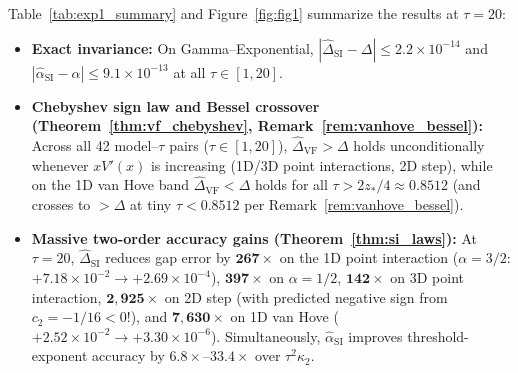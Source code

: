 \documentclass[11pt,a4paper]{article}
\theoremstyle{definition}
\begin{document}
Table~\ref{tab:exp1_summary} and Figure~\ref{fig:fig1} summarize the results at $\tau = 20$:
\begin{itemize}[leftmargin=1.6em,itemsep=2pt]
  \item \textbf{Exact invariance:} On Gamma--Exponential, $|\widehat{\Delta}_{\mathrm{SI}} - \Delta| \le 2.2 \times 10^{-14}$ and $|\widehat{\alpha}_{\mathrm{SI}} - \alpha| \le 9.1 \times 10^{-13}$ at all $\tau \in [1, 20]$.
  \item \textbf{Chebyshev sign law and Bessel crossover (Theorem~\ref{thm:vf_chebyshev}, Remark~\ref{rem:vanhove_bessel}):} Across all 42 model--$\tau$ pairs ($\tau \in [1, 20]$), $\widehat{\Delta}_{\mathrm{VF}} > \Delta$ holds unconditionally whenever $x V'(x)$ is increasing (1D/3D point interactions, 2D step), while on the 1D van Hove band $\widehat{\Delta}_{\mathrm{VF}} < \Delta$ holds for all $\tau > 2 z_*/4 \approx 0.8512$ (and crosses to $> \Delta$ at tiny $\tau < 0.8512$ per Remark~\ref{rem:vanhove_bessel}).
  \item \textbf{Massive two-order accuracy gains (Theorem~\ref{thm:si_laws}):} At $\tau = 20$, $\widehat{\Delta}_{\mathrm{SI}}$ reduces gap error by $\mathbf{267\times}$ on the 1D point interaction ($\alpha = 3/2$: $+7.18 \times 10^{-2} \to +2.69 \times 10^{-4}$), $\mathbf{397\times}$ on $\alpha = 1/2$, $\mathbf{142\times}$ on 3D point interaction, $\mathbf{2{,}925\times}$ on 2D step (with predicted negative sign from $c_2 = -1/16 < 0$!), and $\mathbf{7{,}630\times}$ on 1D van Hove ($+2.52 \times 10^{-2} \to +3.30 \times 10^{-6}$). Simultaneously, $\widehat{\alpha}_{\mathrm{SI}}$ improves threshold-exponent accuracy by $6.8\times$--$33.4\times$ over $\tau^2\kappa_2$.
\end{itemize}
\end{document}
